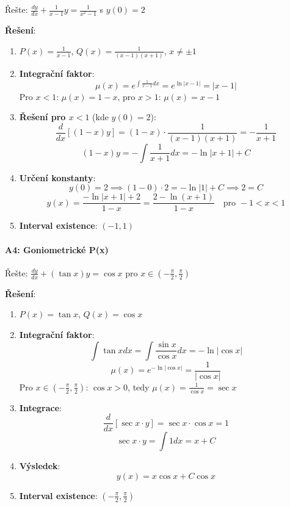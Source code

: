 \vspace{0.6\baselineskip}

\begin{example}
Řešte: $\frac{dy}{dx} + \frac{1}{x-1}y = \frac{1}{x^2 - 1}$ s $y(0) = 2$
\vspace{0.3\baselineskip}

\textbf{Řešení}: 
\begin{enumerate}
\item $P(x) = \frac{1}{x-1}$, $Q(x) = \frac{1}{(x-1)(x+1)}$, $x \neq \pm 1$

\item \textbf{Integrační faktor}:
\[
\mu(x) = e^{\int \frac{1}{x-1}dx} = e^{\ln|x-1|} = |x-1|
\]
Pro $x < 1$: $\mu(x) = 1-x$, pro $x > 1$: $\mu(x) = x-1$

\item \textbf{Řešení pro $x < 1$} (kde $y(0) = 2$):
\[
\frac{d}{dx}[(1-x)y] = (1-x)\cdot\frac{1}{(x-1)(x+1)} = -\frac{1}{x+1}
\]
\[
(1-x)y = -\int \frac{1}{x+1}dx = -\ln|x+1| + C
\]

\item \textbf{Určení konstanty}:
\[
y(0) = 2 \implies (1-0)\cdot 2 = -\ln|1| + C \implies 2 = C
\]
\[
y(x) = \frac{-\ln|x+1| + 2}{1-x} = \frac{2 - \ln(x+1)}{1-x} \quad \text{pro } -1 < x < 1
\]

\item \textbf{Interval existence}: $(-1, 1)$
\end{enumerate}
\end{example}

\vspace{0.8\baselineskip}

\paragraph*{A4: Goniometrické P(x)}

\begin{example}
Řešte: $\frac{dy}{dx} + (\tan x)y = \cos x$ pro $x \in (-\frac{\pi}{2}, \frac{\pi}{2})$
\vspace{0.3\baselineskip}

\textbf{Řešení}: 
\begin{enumerate}
\item $P(x) = \tan x$, $Q(x) = \cos x$

\item \textbf{Integrační faktor}:
\[
\int \tan x  dx = \int \frac{\sin x}{\cos x} dx = -\ln|\cos x|
\]
\[
\mu(x) = e^{-\ln|\cos x|} = \frac{1}{|\cos x|}
\]
Pro $x \in (-\frac{\pi}{2}, \frac{\pi}{2})$: $\cos x > 0$, tedy $\mu(x) = \frac{1}{\cos x} = \sec x$

\item \textbf{Integrace}:
\[
\frac{d}{dx}[\sec x \cdot y] = \sec x \cdot \cos x = 1
\]
\[
\sec x \cdot y = \int 1  dx = x + C
\]

\item \textbf{Výsledek}:
\[
y(x) = x \cos x + C \cos x
\]

\item \textbf{Interval existence}: $(-\frac{\pi}{2}, \frac{\pi}{2})$
\end{enumerate}
\end{example}

